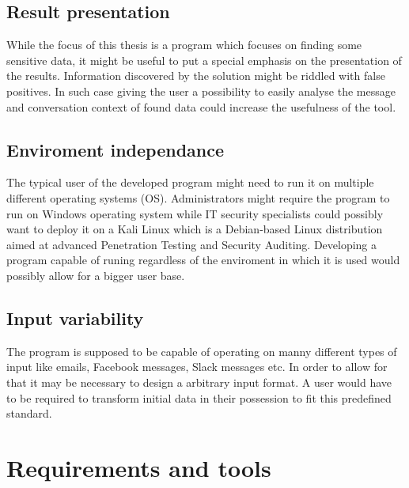 \documentclass[a4paper,twoside,12pt]{book}
\begin{document}
\section{Result presentation}

While the focus of this thesis is a program which focuses on finding some sensitive data, it might be useful to put a special emphasis on the
presentation of the results. Information discovered by the solution might be riddled with false positives. In such case giving the user a possibility
to easily analyse the message and conversation context of found data could increase the usefulness of the tool. 

\section{Enviroment independance}

The typical user of the developed program might need to run it on multiple different operating systems (OS). Administrators might require the program to run
on Windows operating system while IT security specialists could possibly want to deploy it on a Kali Linux which is a Debian-based Linux distribution 
aimed at advanced Penetration Testing and Security Auditing. Developing a program capable of runing regardless of the enviroment in which it is used would possibly
allow for a bigger user base.

\section{Input variability}

The program is supposed to be capable of operating on manny different types of input like emails, Facebook messages, Slack messages etc. In order to 
allow for that it may be necessary to design a arbitrary input format. A user would have to be required to transform initial data in their possession to 
fit this predefined standard. 

\chapter{Requirements and tools}
\end{document}
